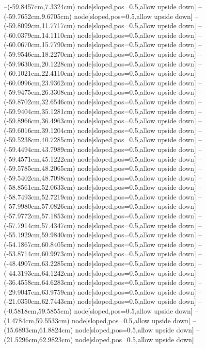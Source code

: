 --(-59.8457cm,7.3324cm) node[sloped,pos=0.5,allow upside down]{\ArrowIn}
--(-59.7652cm,9.6705cm) node[sloped,pos=0.5,allow upside down]{\ArrowIn}
--(-59.8099cm,11.7717cm) node[sloped,pos=0.5,allow upside down]{\ArrowIn}
--(-60.0379cm,14.1110cm) node[sloped,pos=0.5,allow upside down]{\ArrowIn}
--(-60.0670cm,15.7790cm) node[sloped,pos=0.5,allow upside down]{\ArrowIn}
--(-59.9546cm,18.2270cm) node[sloped,pos=0.5,allow upside down]{\ArrowIn}
--(-59.9630cm,20.1228cm) node[sloped,pos=0.5,allow upside down]{\ArrowIn}
--(-60.1021cm,22.4110cm) node[sloped,pos=0.5,allow upside down]{\ArrowIn}
--(-60.0996cm,23.9362cm) node[sloped,pos=0.5,allow upside down]{\ArrowIn}
--(-59.9475cm,26.3308cm) node[sloped,pos=0.5,allow upside down]{\ArrowIn}
--(-59.8702cm,32.6546cm) node[sloped,pos=0.5,allow upside down]{\ArrowIn}
--(-59.9404cm,35.1281cm) node[sloped,pos=0.5,allow upside down]{\ArrowIn}
--(-59.8966cm,36.4963cm) node[sloped,pos=0.5,allow upside down]{\ArrowIn}
--(-59.6016cm,39.1204cm) node[sloped,pos=0.5,allow upside down]{\ArrowIn}
--(-59.5238cm,40.7285cm) node[sloped,pos=0.5,allow upside down]{\ArrowIn}
--(-59.4494cm,43.7989cm) node[sloped,pos=0.5,allow upside down]{\ArrowIn}
--(-59.4571cm,45.1222cm) node[sloped,pos=0.5,allow upside down]{\ArrowIn}
--(-59.5785cm,48.2065cm) node[sloped,pos=0.5,allow upside down]{\ArrowIn}
--(-59.5402cm,48.7098cm) node[sloped,pos=0.5,allow upside down]{\arrowIn}
--(-58.8561cm,52.0633cm) node[sloped,pos=0.5,allow upside down]{\ArrowIn}
--(-58.7493cm,52.7219cm) node[sloped,pos=0.5,allow upside down]{\arrowIn}
--(-57.9980cm,57.0826cm) node[sloped,pos=0.5,allow upside down]{\ArrowIn}
--(-57.9772cm,57.1853cm) node[sloped,pos=0.5,allow upside down]{\arrowIn}
--(-57.7914cm,57.4347cm) node[sloped,pos=0.5,allow upside down]{\arrowIn}
--(-55.1929cm,59.9840cm) node[sloped,pos=0.5,allow upside down]{\ArrowIn}
--(-54.1867cm,60.8405cm) node[sloped,pos=0.5,allow upside down]{\ArrowIn}
--(-53.8714cm,60.9973cm) node[sloped,pos=0.5,allow upside down]{\arrowIn}
--(-48.4907cm,63.2285cm) node[sloped,pos=0.5,allow upside down]{\ArrowIn}
--(-44.3193cm,64.1242cm) node[sloped,pos=0.5,allow upside down]{\ArrowIn}
--(-36.4558cm,64.6283cm) node[sloped,pos=0.5,allow upside down]{\ArrowIn}
--(-29.9047cm,63.9759cm) node[sloped,pos=0.5,allow upside down]{\ArrowIn}
--(-21.0350cm,62.7443cm) node[sloped,pos=0.5,allow upside down]{\ArrowIn}
--(-0.5818cm,59.5855cm) node[sloped,pos=0.5,allow upside down]{\ArrowIn}
--(1.4784cm,59.5533cm) node[sloped,pos=0.5,allow upside down]{\ArrowIn}
--(15.6893cm,61.8824cm) node[sloped,pos=0.5,allow upside down]{\ArrowIn}
--(21.5296cm,62.9823cm) node[sloped,pos=0.5,allow upside down]{\ArrowIn}
